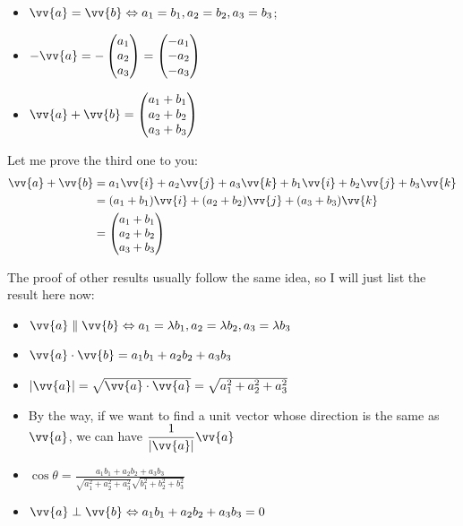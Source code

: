 \documentclass[12pt, a4paper, reqno]{amsart}
\theoremstyle{definition}
\numberwithin{equation}{section} %
\begin{document}
\begin{itemize}
	\item $\vv{a} = \vv{b} \Leftrightarrow a_1 = b_1, a_2 = b_2, a_3 = b_3$;
	\item $-\vv{a}=-\begin{pmatrix}
		a_1	\\
		a_2 \\
		a_3
	\end{pmatrix}=\begin{pmatrix}
	-a_1	\\
	-a_2 \\
	-a_3
	\end{pmatrix}$
	\item $\vv{a}+\vv{b} = \begin{pmatrix}
		a_1 + b_1	\\
		a_2 + b_2 \\
		a_3 + b_3
	\end{pmatrix}$
\end{itemize}

Let me prove the third one to you:
\begin{align*}
	\vv{a}+\vv{b} &= a_1 \vv{i} + a_2 \vv{j} + a_3 \vv{k} + b_1 \vv{i} + b_2\vv{j} + b_3\vv{k}\\
				  &= (a_1 + b_1) \vv{i} + (a_2 + b_2) \vv{j} + (a_3 + b_3)\vv{k}\\
				  &= \begin{pmatrix}
				  	a_1 + b_1	\\
				  	a_2 + b_2 \\
				  	a_3 + b_3
				  \end{pmatrix}
\end{align*}

The proof of other results usually follow the same idea, so I will just list the result here now:
\begin{itemize}
	\item $\vv{a}\parallel \vv{b} \Leftrightarrow a_1 = \lambda b_1, a_2 = \lambda b_2, a_3 = \lambda b_3$
	\item $\vv{a}\cdot \vv{b} = a_1b_1 + a_2b_2 + a_3b_3$
	\item $\left|\vv{a}\right| = \sqrt{\vv{a}\cdot \vv{a}} = \sqrt{a_1^2 + a_2^2 + a_3^2}$
	\item By the way, if we want to find a unit vector whose direction is the same as $\vv{a}$, we can have $\displaystyle \frac{1}{\left|\vv{a}\right|}\vv{a}$
	\item $\cos \theta =\displaystyle \frac{a_1b_1 + a_2b_2 + a_3b_3}
	{\sqrt{a_1^2 + a_2^2 + a_3^2}\sqrt{b_1^2 + b_2^2 + b_3^2}}$
	\item $\vv{a} \perp \vv{b} \Leftrightarrow a_1b_1 + a_2b_2 + a_3b_3=0$
\end{itemize}
\end{document}
